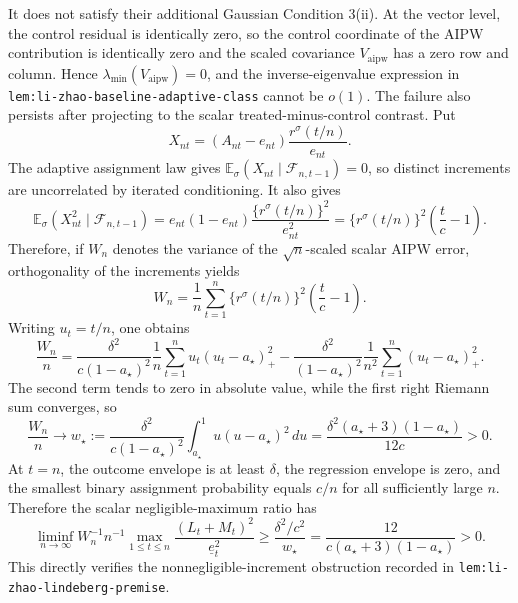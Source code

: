 It does not satisfy their additional Gaussian Condition 3(ii). At the vector level, the control residual is identically zero, so the control coordinate of the AIPW contribution is identically zero and the scaled covariance \(V_{\mathrm{aipw}}\) has a zero row and column. Hence \(\lambda_{\min}(V_{\mathrm{aipw}})=0\), and the inverse-eigenvalue expression in \texttt{lem:li-zhao-baseline-adaptive-class} cannot be \(o(1)\). The failure also persists after projecting to the scalar treated-minus-control contrast. Put
\[
 X_{nt}=(A_{nt}-e_{nt})\frac{r^\sigma(t/n)}{e_{nt}}.
\]
The adaptive assignment law gives \(\mathbb E_\sigma(X_{nt}\mid\mathcal F_{n,t-1})=0\), so distinct increments are uncorrelated by iterated conditioning. It also gives
\[
 \mathbb E_\sigma(X_{nt}^2\mid\mathcal F_{n,t-1})
 =e_{nt}(1-e_{nt})\frac{\{r^\sigma(t/n)\}^2}{e_{nt}^2}
 =\{r^\sigma(t/n)\}^2\left(\frac tc-1\right).
\]
Therefore, if \(W_n\) denotes the variance of the \(\sqrt n\)-scaled scalar AIPW error, orthogonality of the increments yields
\[
 W_n
 =\frac1n\sum_{t=1}^{n}
 \{r^\sigma(t/n)\}^2\left(\frac tc-1\right).
\]
Writing \(u_t=t/n\), one obtains
\[
 \frac{W_n}{n}
 =\frac{\delta^2}{c(1-a_\star)^2}
   \frac1n\sum_{t=1}^{n}u_t(u_t-a_\star)_+^2
 -\frac{\delta^2}{(1-a_\star)^2}
   \frac1{n^2}\sum_{t=1}^{n}(u_t-a_\star)_+^2.
\]
The second term tends to zero in absolute value, while the first right Riemann sum converges, so
\[
 \frac{W_n}{n}\longrightarrow
 w_\star
 :=\frac{\delta^2}{c(1-a_\star)^2}
   \int_{a_\star}^{1}u(u-a_\star)^2\,du
 =\frac{\delta^2(a_\star+3)(1-a_\star)}{12c}>0.
\]
At \(t=n\), the outcome envelope is at least \(\delta\), the regression envelope is zero, and the smallest binary assignment probability equals \(c/n\) for all sufficiently large \(n\). Therefore the scalar negligible-maximum ratio has
\[
 \liminf_{n\to\infty}
 W_n^{-1}n^{-1}
 \max_{1\le t\le n}
 \frac{(L_t+M_t)^2}{\underline e_t^2}
 \ge\frac{\delta^2/c^2}{w_\star}
 =\frac{12}{c(a_\star+3)(1-a_\star)}>0.
\]
This directly verifies the nonnegligible-increment obstruction recorded in \texttt{lem:li-zhao-lindeberg-premise}.

